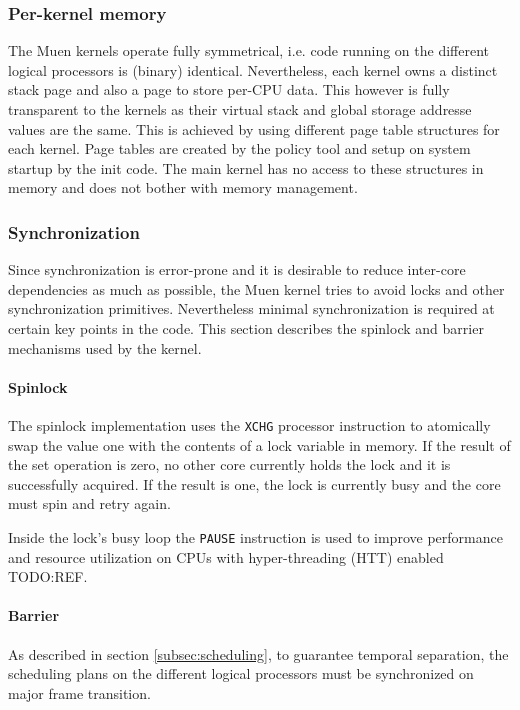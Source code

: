 \subsubsection{Per-kernel memory}
The Muen kernels operate fully symmetrical, i.e. code running on the different
logical processors is (binary) identical. Nevertheless, each kernel owns a
distinct stack page and also a page to store per-CPU data. This however is fully
transparent to the kernels as their virtual stack and global storage addresse
values are the same. This is achieved by using different page table structures
for each kernel. Page tables are created by the policy tool and setup on system
startup by the init code. The main kernel has no access to these structures in
memory and does not bother with memory management.

\subsubsection{Synchronization} Since synchronization is error-prone and it is
desirable to reduce inter-core dependencies as much as possible, the Muen
kernel tries to avoid locks and other synchronization primitives. Nevertheless
minimal synchronization is required at certain key points in the code. This
section describes the spinlock and barrier mechanisms used by the kernel.

\paragraph{Spinlock}
The spinlock implementation uses the \texttt{XCHG} processor instruction to
atomically swap the value one with the contents of a lock variable in memory.
If the result of the set operation is zero, no other core currently holds the
lock and it is successfully acquired. If the result is one, the lock is
currently busy and the core must spin and retry again.

Inside the lock's busy loop the \texttt{PAUSE} instruction is used to improve
performance and resource utilization on CPUs with hyper-threading
(HTT) enabled TODO:REF.

\paragraph{Barrier}
As described in section \ref{subsec:scheduling}, to guarantee temporal
separation, the scheduling plans on the different logical processors must be
synchronized on major frame transition.

